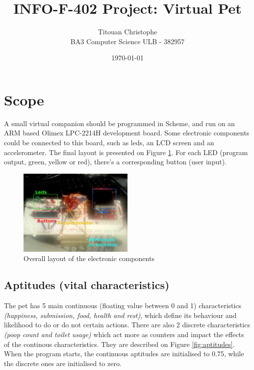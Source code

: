\documentclass[a4paper]{article}
\author{Titouan Christophe\\BA3 Computer Science ULB - 382957}
\date{\today}
\title{INFO-F-402 Project: Virtual Pet}
\begin{document}
\maketitle

\section{Scope}
A small virtual companion should be programmed in Scheme, and run on an ARM based Olimex LPC-2214H development board. Some electronic components could be connected to this board, such as leds, an LCD screen and an accelerometer. The final layout is presented on Figure \ref{fig:layout}. For each LED (program output, green, yellow or red), there's a corresponding button (user input). 

\begin{figure}[h]
  \centering
  \includegraphics[width=0.5\textwidth]{Pictures/layout.png}
  \caption{\label{fig:layout} Overall layout of the electronic components}
\end{figure}

\subsection{Aptitudes (vital characteristics)}
The pet has 5 main continuous (floating value between 0 and 1) characteristics \textit{(happiness, submission, food, health and rest)}, which define its behaviour and likelihood to do or do not certain actions. There are also 2 discrete characteristics \textit{(poop count and toilet usage)} which act more as counters and impact the effects of the continous characteristics. They are described on Figure \ref{fig:aptitudes}. When the program starts, the continuous aptitudes are initialised to 0.75, while the discrete ones are initialised to zero.
\end{document}
